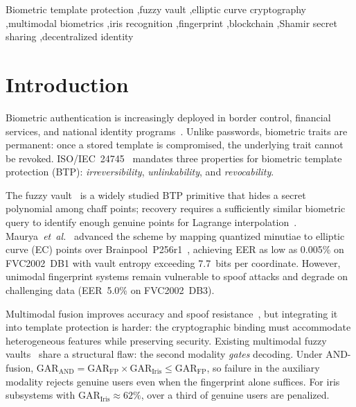\documentclass[3p,twocolumn]{elsarticle}
\newcommand{\GAR}{\mathrm{GAR}}
\begin{document}
\begin{frontmatter}
\begin{keyword}
Biometric template protection \sep fuzzy vault \sep elliptic curve cryptography \sep multimodal biometrics \sep iris recognition \sep fingerprint \sep blockchain \sep Shamir secret sharing \sep decentralized identity
\end{keyword}

\end{frontmatter}


\section{Introduction}
\label{sec:introduction}

Biometric authentication is increasingly deployed in border control, financial services, and national identity programs~\cite{jain2004multibiometrics}. Unlike passwords, biometric traits are permanent: once a stored template is compromised, the underlying trait cannot be revoked. ISO/IEC~24745~\cite{iso24745} mandates three properties for biometric template protection (BTP): \emph{irreversibility}, \emph{unlinkability}, and \emph{revocability}.

The fuzzy vault~\cite{juels2002fuzzy} is a widely studied BTP primitive that hides a secret polynomial among chaff points; recovery requires a sufficiently similar biometric query to identify enough genuine points for Lagrange interpolation~\cite{rathgeb2011survey}. Maurya~\textit{et~al.}~\cite{maurya2025enhancing} advanced the scheme by mapping quantized minutiae to elliptic curve (EC) points over Brainpool~P256r1~\cite{rfc5639}, achieving EER as low as 0.005\% on FVC2002~DB1 with vault entropy exceeding 7.7~bits per coordinate. However, unimodal fingerprint systems remain vulnerable to spoof attacks and degrade on challenging data (EER~5.0\% on FVC2002~DB3).

Multimodal fusion improves accuracy and spoof resistance~\cite{ross2003information}, but integrating it into template protection is harder: the cryptographic binding must accommodate heterogeneous features while preserving security. Existing multimodal fuzzy vaults~\cite{nandakumar2008multibiometric,moon2010multibiometric} share a structural flaw: the second modality \emph{gates} decoding. Under AND-fusion, $\GAR_{\text{AND}} = \GAR_{\text{FP}} \times \GAR_{\text{Iris}} \leq \GAR_{\text{FP}}$, so failure in the auxiliary modality rejects genuine users even when the fingerprint alone suffices. For iris subsystems with $\GAR_{\text{Iris}} \approx 62\%$, over a third of genuine users are penalized.
\end{document}
